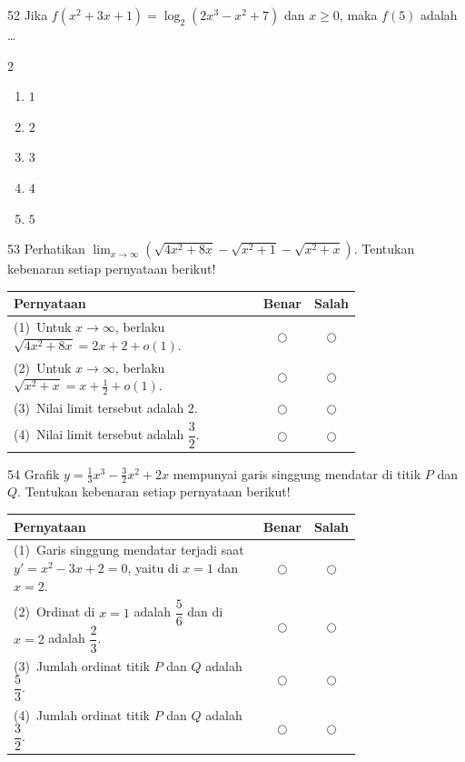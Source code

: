 \documentclass[11pt]{article}
\newenvironment{pilB}{%
  \par\smallskip\begin{multicols}{2}
  \begin{enumerate}[label=(\Alph*),leftmargin=*,itemsep=1pt,topsep=3pt]}%
  {\end{enumerate}\end{multicols}}
\begin{document}
\begin{soal}{52}
Jika $f(x^2+3x+1)=\log_2(2x^3-x^2+7)$ dan $x\geq0$, maka $f(5)$
adalah \ldots
\begin{pilB}
  \item $1$ \item $2$ \item $3$ \item $4$ \item $5$
\end{pilB}
\end{soal}

\begin{soal}{53}
Perhatikan $\displaystyle\lim_{x\to\infty}
\!\left(\sqrt{4x^2+8x}-\sqrt{x^2+1}-\sqrt{x^2+x}\right)$.
Tentukan kebenaran setiap pernyataan berikut!

\par\smallskip
{\renewcommand{\arraystretch}{1.4}%
\begin{tabular}{@{}p{0.76\linewidth}cc@{}}
\hline
\textbf{Pernyataan} & \textbf{Benar} & \textbf{Salah}\\
\hline
(1)~Untuk $x\to\infty$, berlaku $\sqrt{4x^2+8x}=2x+2+o(1)$.
  & $\bigcirc$ & $\bigcirc$\\
(2)~Untuk $x\to\infty$, berlaku $\sqrt{x^2+x}=x+\tfrac{1}{2}+o(1)$.
  & $\bigcirc$ & $\bigcirc$\\
(3)~Nilai limit tersebut adalah $2$.
  & $\bigcirc$ & $\bigcirc$\\
(4)~Nilai limit tersebut adalah $\dfrac{3}{2}$.
  & $\bigcirc$ & $\bigcirc$\\
\hline
\end{tabular}}
\end{soal}

\begin{soal}{54}
Grafik $y=\tfrac{1}{3}x^3-\tfrac{3}{2}x^2+2x$ mempunyai garis singgung
mendatar di titik $P$ dan $Q$.
Tentukan kebenaran setiap pernyataan berikut!

\par\smallskip
{\renewcommand{\arraystretch}{1.4}%
\begin{tabular}{@{}p{0.76\linewidth}cc@{}}
\hline
\textbf{Pernyataan} & \textbf{Benar} & \textbf{Salah}\\
\hline
(1)~Garis singgung mendatar terjadi saat $y'=x^2-3x+2=0$,
    yaitu di $x=1$ dan $x=2$.
  & $\bigcirc$ & $\bigcirc$\\
(2)~Ordinat di $x=1$ adalah $\dfrac{5}{6}$ dan di $x=2$ adalah
    $\dfrac{2}{3}$.
  & $\bigcirc$ & $\bigcirc$\\
(3)~Jumlah ordinat titik $P$ dan $Q$ adalah $\dfrac{5}{3}$.
  & $\bigcirc$ & $\bigcirc$\\
(4)~Jumlah ordinat titik $P$ dan $Q$ adalah $\dfrac{3}{2}$.
  & $\bigcirc$ & $\bigcirc$\\
\hline
\end{tabular}}
\end{soal}
\end{document}
